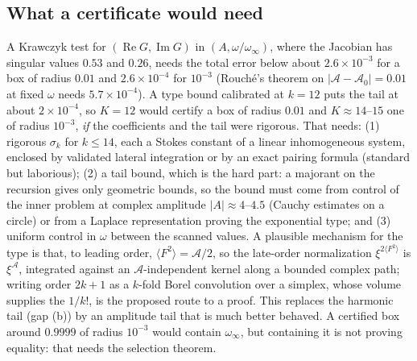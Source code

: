\documentclass{amsart}
\numberwithin{equation}{section}
\theoremstyle{plain}
\theoremstyle{definition}
\theoremstyle{remark}
\newcommand{\winf}{\omega_\infty}
\newcommand{\re}{\operatorname{Re}}
\newcommand{\im}{\operatorname{Im}}
\begin{document}
\subsection{What a certificate would need}
A Krawczyk test for $(\re G, \im G)$ in $(A, \omega/\winf)$, where the Jacobian has singular values $0.53$ and $0.26$,
needs the total error below about $2.6\times10^{-3}$ for a box of radius $0.01$ and $2.6\times10^{-4}$ for $10^{-3}$ (Rouch\'e's theorem on
$|\mathcal A - \mathcal A_0| = 0.01$ at fixed $\omega$ needs $5.7\times10^{-4}$). A type bound calibrated at $k = 12$ puts the tail at about
$2\times10^{-4}$, so $K = 12$ would certify a box of radius $0.01$ and $K \approx 14$--$15$ one of radius $10^{-3}$, \emph{if} the
coefficients and the tail were rigorous. That needs:
(1) rigorous $\sigma_k$ for $k \le 14$, each a Stokes constant of a linear inhomogeneous system, enclosed by validated lateral
integration or by an exact pairing formula (standard but laborious); (2) a tail bound, which is the hard part: a majorant on
the recursion gives only geometric bounds, so the bound must come from control of the inner problem at complex amplitude
$|A| \approx 4$--$4.5$ (Cauchy estimates on a circle) or from a Laplace representation proving the exponential type; and (3)
uniform control in $\omega$ between the scanned values. A plausible mechanism for the type is that, to leading order,
$\langle F^2\rangle = \mathcal A/2$, so the late-order normalization $\xi^{2\langle F^2\rangle}$ is $\xi^{\mathcal A}$, integrated against an $\mathcal A$-independent kernel along a
bounded complex path; writing order $2k + 1$ as a $k$-fold Borel convolution over a simplex, whose volume supplies the $1/k!$, is
the proposed route to a proof. This replaces the harmonic tail (gap (b)) by an amplitude tail that is much better behaved.
A certified box around $0.9999$ of radius $10^{-3}$ would contain $\winf$, but containing it is not proving equality: that needs the
selection theorem.
\end{document}
